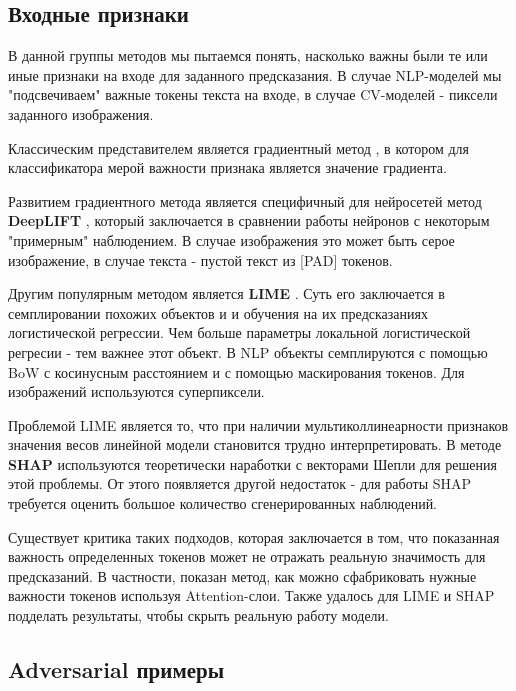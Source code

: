 \subsection{Входные признаки}

В данной группы методов мы пытаемся понять, насколько важны были те или иные признаки на входе для заданного предсказания. В случае NLP-моделей мы "подсвечиваем" важные токены текста на входе, в случае CV-моделей - пиксели заданного изображения.

Классическим представителем является градиентный метод \cite{baehrensHowExplainIndividual2009}, в котором для классификатора мерой важности признака является значение градиента.

Развитием градиентного метода является специфичный для нейросетей метод \textbf{DeepLIFT} \cite{shrikumarLearningImportantFeatures2019}, который заключается в сравнении работы нейронов с некоторым "примерным" наблюдением. В случае изображения это может быть серое изображение, в случае текста - пустой текст из [PAD] токенов. 

Другим популярным методом является \textbf{LIME} \cite{ribeiroWhyShouldTrust2016}. Суть его заключается в семплировании похожих объектов и и обучения на их предсказаниях логистической регрессии. Чем больше параметры локальной логистической регресии - тем важнее этот объект. В NLP объекты семплируются с помощью BoW с косинусным расстоянием и с помощью маскирования токенов. Для изображений используются суперпиксели.

Проблемой LIME является то, что при наличии мультиколлинеарности признаков значения весов линейной модели становится трудно интерпретировать. В методе \textbf{SHAP} \cite{lundbergUnifiedApproachInterpreting2017} используются теоретически наработки с векторами Шепли для решения этой проблемы. От этого появляется другой недостаток - для работы SHAP требуется оценить большое количество сгенерированных наблюдений.

Существует критика таких подходов, которая заключается в том, что показанная важность определенных токенов может не отражать реальную значимость для предсказаний. В частности, \cite{pruthiLearningDeceiveAttentionBased2020a} показан метод, как можно сфабриковать нужные важности токенов используя Attention-слои. Также \cite{slackFoolingLIMESHAP2020} удалось для LIME и SHAP подделать результаты, чтобы скрыть реальную работу модели.

\vspace{8mm}
\subsection{Adversarial примеры}

